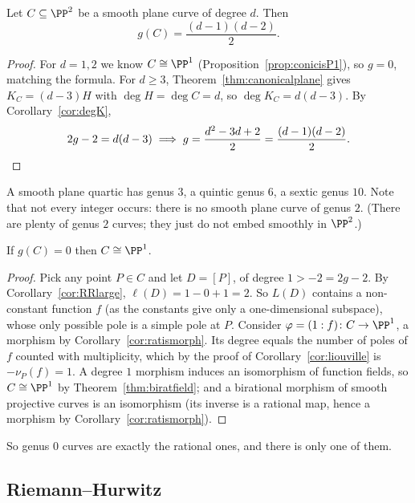 \begin{corollary}\label{cor:genusdegree}
	Let $C \subseteq \PP^2$ be a smooth plane curve of degree $d$. Then
	$$g(C) = \frac{(d-1)(d-2)}{2}.$$
\end{corollary}

\begin{proof}
	For $d = 1,2$ we know $C \cong \PP^1$ (Proposition~\ref{prop:conicisP1}), so $g = 0$, matching the formula. For $d \geq 3$, Theorem~\ref{thm:canonicalplane} gives $K_C = (d-3)H$ with $\deg H = \deg C = d$, so $\deg K_C = d(d-3)$. By Corollary~\ref{cor:degK},
	$$2g - 2 = d(d-3) \implies g = \frac{d^2-3d+2}{2} = \frac{(d-1)(d-2)}{2}. \qedhere$$
\end{proof}

\begin{example}
	A smooth plane quartic has genus $3$, a quintic genus $6$, a sextic genus $10$. Note that not every integer occurs: there is no smooth plane curve of genus $2$. (There are plenty of genus $2$ curves; they just do not embed smoothly in $\PP^2$.)
\end{example}

\begin{corollary}\label{cor:g0}
	If $g(C) = 0$ then $C \cong \PP^1$.
\end{corollary}

\begin{proof}
	Pick any point $P \in C$ and let $D = [P]$, of degree $1 > -2 = 2g-2$. By Corollary~\ref{cor:RRlarge}, $\ell(D) = 1 - 0 + 1 = 2$. So $L(D)$ contains a non-constant function $f$ (as the constants give only a one-dimensional subspace), whose only possible pole is a simple pole at $P$. Consider $\varphi = (1:f)\colon C \to \PP^1$, a morphism by Corollary~\ref{cor:ratismorph}. Its degree equals the number of poles of $f$ counted with multiplicity, which by the proof of Corollary~\ref{cor:liouville} is $-\nu_P(f) = 1$. A degree $1$ morphism induces an isomorphism of function fields, so $C \cong \PP^1$ by Theorem~\ref{thm:biratfield}; and a birational morphism of smooth projective curves is an isomorphism (its inverse is a rational map, hence a morphism by Corollary~\ref{cor:ratismorph}).
\end{proof}

So genus $0$ curves are exactly the rational ones, and there is only one of them.

\subsection{Riemann--Hurwitz}

